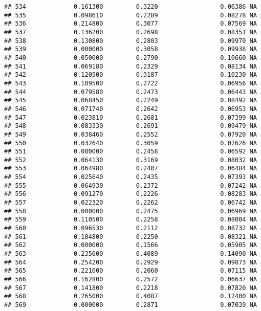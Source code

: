 \documentclass[
]{article}
\begin{document}
\begin{verbatim}
## 534             0.161300         0.3220                 0.06386 NA
## 535             0.098610         0.2289                 0.08278 NA
## 536             0.214800         0.3077                 0.07569 NA
## 537             0.136200         0.2698                 0.08351 NA
## 538             0.130800         0.2803                 0.09970 NA
## 539             0.000000         0.3058                 0.09938 NA
## 540             0.050000         0.2790                 0.10660 NA
## 541             0.069180         0.2329                 0.08134 NA
## 542             0.120500         0.3187                 0.10230 NA
## 543             0.109500         0.2722                 0.06956 NA
## 544             0.079580         0.2473                 0.06443 NA
## 545             0.068450         0.2249                 0.08492 NA
## 546             0.071740         0.2642                 0.06953 NA
## 547             0.023810         0.2681                 0.07399 NA
## 548             0.083330         0.2691                 0.09479 NA
## 549             0.038460         0.2552                 0.07920 NA
## 550             0.032640         0.3059                 0.07626 NA
## 551             0.000000         0.2458                 0.06592 NA
## 552             0.064130         0.3169                 0.08032 NA
## 553             0.064980         0.2407                 0.06484 NA
## 554             0.025640         0.2435                 0.07393 NA
## 555             0.064930         0.2372                 0.07242 NA
## 556             0.091270         0.2226                 0.08283 NA
## 557             0.022320         0.2262                 0.06742 NA
## 558             0.000000         0.2475                 0.06969 NA
## 559             0.110500         0.2258                 0.08004 NA
## 560             0.096530         0.2112                 0.08732 NA
## 561             0.104800         0.2250                 0.08321 NA
## 562             0.000000         0.1566                 0.05905 NA
## 563             0.235600         0.4089                 0.14090 NA
## 564             0.254200         0.2929                 0.09873 NA
## 565             0.221600         0.2060                 0.07115 NA
## 566             0.162800         0.2572                 0.06637 NA
## 567             0.141800         0.2218                 0.07820 NA
## 568             0.265000         0.4087                 0.12400 NA
## 569             0.000000         0.2871                 0.07039 NA
\end{verbatim}
\end{document}
